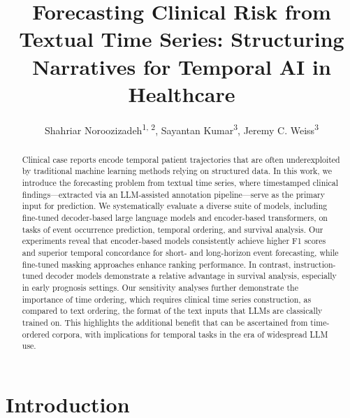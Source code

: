 \documentclass[letterpaper]{article} %
\title{Forecasting Clinical Risk from Textual Time Series: Structuring Narratives for Temporal AI in Healthcare}
\author{
    Shahriar Noroozizadeh\textsuperscript{\rm 1, 2}\equalcontrib,
    Sayantan Kumar\textsuperscript{\rm 3}\equalcontrib,
    Jeremy C. Weiss\textsuperscript{\rm 3}
}
\begin{document}
\maketitle

\begin{abstract}
Clinical case reports encode temporal patient trajectories that are often underexploited by traditional machine learning methods relying on structured data. 
In this work, we introduce the forecasting problem from textual time series, where timestamped clinical findings---extracted via an LLM-assisted annotation pipeline---serve as the primary input for prediction. 
We systematically evaluate a diverse suite of models, including fine-tuned decoder-based large language models and encoder-based transformers, on tasks of event occurrence prediction, temporal ordering, and survival analysis. 
Our experiments reveal that encoder-based models consistently achieve higher F1 scores and superior temporal concordance for short- and long-horizon event forecasting, while fine-tuned masking approaches enhance ranking performance. 
In contrast, instruction-tuned decoder models demonstrate a relative advantage in survival analysis, especially in early prognosis settings. 
Our sensitivity analyses further demonstrate the importance of time ordering, which requires clinical time series construction, as compared to text ordering, the format of the text inputs that LLMs are classically trained on. 
This highlights the additional benefit that can be ascertained from time-ordered corpora, with implications for temporal tasks in the era of widespread LLM use. 
\end{abstract}

%

\section{Introduction}
\end{document}
